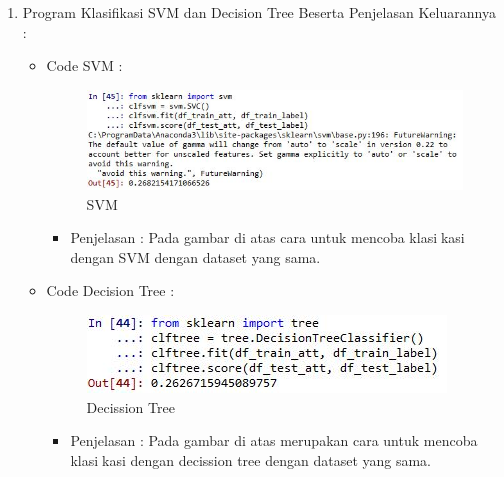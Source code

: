 \begin{enumerate}
\par
\par
\item Program Klasifikasi SVM dan Decision Tree Beserta Penjelasan Keluarannya :
\begin{itemize}
\item Code SVM :
\par
\begin{figure}[ht]
\centering
\includegraphics[scale=0.7]{figures/pd24.jpg}
\caption{SVM}
\label{contoh}
\end{figure}
\par
\begin{itemize}
\item Penjelasan : Pada gambar di atas cara untuk mencoba klasikasi dengan SVM dengan dataset yang sama.
\par 
\par
\end{itemize}
\item Code Decision Tree :
\par
\begin{figure}[ht]
\centering
\includegraphics[scale=0.7]{figures/pd25.jpg}
\caption{Decission Tree}
\label{contoh}
\end{figure}
\par
\begin{itemize}
\item Penjelasan : Pada gambar di atas merupakan cara untuk mencoba klasikasi dengan decission tree dengan dataset yang sama.
\par
\par
\end{itemize}
\end{itemize}




\end{enumerate}

